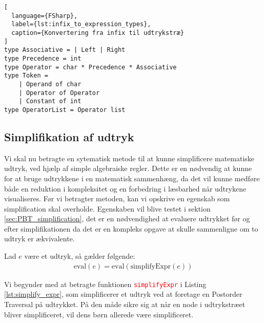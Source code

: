 \begin{lstlisting}[
  language={FSharp}, 
  label={lst:infix_to_expression_types}, 
  caption={Konvertering fra infix til udtrykstræ}
]
type Associative = | Left | Right
type Precedence = int
type Operator = char * Precedence * Associative
type Token =
    | Operand of char
    | Operator of Operator
    | Constant of int
type OperatorList = Operator list
\end{lstlisting}




\subsection{Simplifikation af udtryk} \label{sec:simplification_expression}
Vi skal nu betragte en sytematisk metode til at kunne simplificere matematiske udtryk, ved hjælp af simple algebraiske regler. Dette er en nødvendig at kunne for at bruge udtrykkene i en matematisk sammenhæng, da det vil kunne medføre både en reduktion i kompleksitet og en forbedring i læsbarhed når udtrykene visualiseres. Før vi betragter metoden, kan vi opskrive en egenskab som simplification skal overholde. Egenskaben vil blive testet i sektion \ref{sec:PBT_simplification}, det er en nødvendighed at evaluere udtrykket før og efter simplifikationen da det er en kompleks opgave at skulle sammenligne om to udtryk er ækvivalente.
\vspace{0.5cm}
\begin{egenskab}\label{egenskab:simplification}
Lad $e$ være et udtryk, så gælder følgende:
\begin{align*}
  \text{eval}(e) = \text{eval}(\text{simplifyExpr}(e))
\end{align*}
\end{egenskab}

Vi begynder med at betragte funktionen \textcolor{red}{\texttt{simplifyExpr}} i Listing \ref{lst:simplify_expr}, som simplificerer et udtryk ved at foretage en Postorder Traversal på udtrykket. På den måde sikre sig at når en node i udtrykstræet bliver simplificeret, vil dens børn allerede være simplificeret. 


